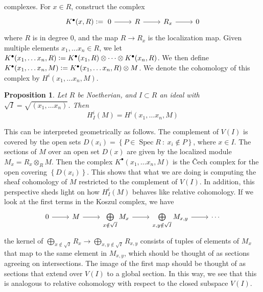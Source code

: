 \documentclass[psamsfonts, 12pt]{amsart}
\newtheorem{prop}[thm]{Proposition}
\theoremstyle{definition}
\theoremstyle{remark}
\newcommand{\set}[1]{\left\lbrace #1 \right\rbrace}
\newcommand{\defeq}{\vcentcolon=}
\DeclareMathOperator{\Spec}{Spec}
\begin{document}
complexes. For $x \in R$, construct
the complex
\[\begin{tikzcd}
K^\bullet(x,R) \defeq ~ 0 \ar[r] & R \ar[r] & R_x \ar[r] & 0
\end{tikzcd}\]
where $R$ is in degree $0$, and the map $R \to R_x$ is the localization map. Given
multiple elements $x_1,\ldots x_n \in R$, we let
$K^\bullet(x_1,\ldots x_n, R) \defeq
K^\bullet(x_1,R) \otimes \cdots \otimes K^\bullet(x_n,R)$. We then define
$K^\bullet(x_1,\ldots x_n, M) \defeq K^\bullet(x_1,\ldots x_n, R) \otimes M$. We
denote the cohomology of this complex by $H^i(x_1,\ldots x_n, M)$.
%
\begin{prop}
Let $R$ be Noetherian, and $I \subset R$ an ideal with
$\sqrt{I} = \sqrt{(x_1,\ldots x_n)}$. Then
\[
H^i_I(M) = H^i(x_1,\ldots x_n, M)
\]
\end{prop}
%
This can be interpreted geometrically as follows. The complement of $V(I)$ is covered
by the open sets $D(x_i) = \set{P \in \Spec R ~:~ x_i \notin P}$, where $x \in I$. The
sections of $M$ over an open set $D(x)$ are given by the localized module
$M_x = R_x \otimes_R M$. Then the complex $K^\bullet(x_1,\ldots x_n, M)$ is
the \v{C}ech complex for the open covering $\set{D(x_i)}$. This shows that what we are
doing is computing the sheaf cohomology of $M$ restricted to the complement of $V(I)$.
In addition, this perspective sheds light on how $H^i_I(M)$ behaves like relative
cohomology. If we look at the first terms in the Koszul complex, we have
\[\begin{tikzcd}
0 \ar[r] & M \ar[r] &  \bigoplus\limits_{x \notin \sqrt{I}} M_x
\ar[r] & \bigoplus\limits_{x,y \notin \sqrt{I}} M_{x,y} \ar[r] & \cdots
\end{tikzcd}\]
the kernel of
$\bigoplus_{x \notin \sqrt{I}} R_x \to \bigoplus_{x,y \notin \sqrt{I}} R_{x,y}$
consists of tuples of elements of $M_x$ that map to the same element in $M_{x,y}$,
which should be thought of as sections agreeing on intersections. The image
of the first map should be thought of as sections that extend over $V(I)$ to a
global section. In this way, we see that this is analogous to relative cohomology
with respect to the closed subspace $V(I)$. \\
\end{document}
